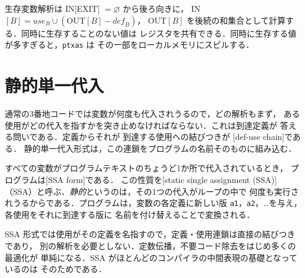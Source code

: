 \documentclass[../main.tex]{subfiles}
\begin{document}
\begin{keypoint}
  生存変数解析は IN[EXIT] $= \varnothing$ から後ろ向きに，
  IN$[B] = \mathit{use}_B \cup (\mathrm{OUT}[B] - \mathit{def}_B)$，
  OUT$[B]$ を後続の和集合として計算する．同時に生存することのない値は
  レジスタを共有できる．同時に生存する値が多すぎると，\texttt{ptxas} は
  その一部をローカルメモリにスピルする．
\end{keypoint}

\section{静的単一代入}
\label{sec:l11-ssa}

通常の3番地コードでは変数が何度も代入されうるので，どの解析もまず，
ある使用がどの代入を指すかを突き止めなければならない．これは到達定義が
答える問いである．定義からそれが
到達する使用への結びつきが
[def-use chain]である．
静的単一代入形式は，この連鎖をプログラムの名前そのものに組み込む．

\begin{definition}[静的単一代入]
  \label{def:l11-ssa}
  すべての変数がプログラムテキストのちょうど1か所で代入されているとき，
  プログラムは[SSA form]である．
  この性質を[static single assignment (SSA)]
  （SSA）と呼ぶ．\emph{静的}というのは，その1つの代入がループの中で
  何度も実行されうるからである．プログラムは，変数の各定義に新しい版
  \texttt{a1}，\texttt{a2}，\ldots を与え，各使用をそれに到達する版に
  名前を付け替えることで変換される．
\end{definition}

%
SSA 形式では使用がその定義を名指すので，定義・使用連鎖は直接の結びつきであり，
別の解析を必要としない．定数伝播，不要コード除去をはじめ多くの最適化が
単純になる．SSA がほとんどのコンパイラの中間表現の基礎となっているのは
そのためである．
\end{document}
